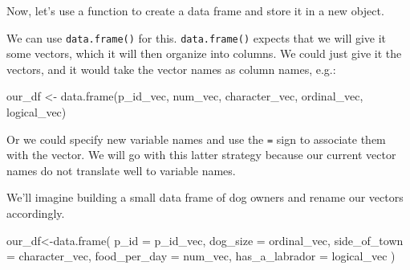 \documentclass[
  letterpaper,
  DIV=11,
  numbers=noendperiod]{scrreprt}
\newenvironment{Shaded}{\begin{snugshade}}{\end{snugshade}}
\newcommand{\AttributeTok}[1]{\textcolor[rgb]{0.40,0.45,0.13}{#1}}
\newcommand{\FunctionTok}[1]{\textcolor[rgb]{0.28,0.35,0.67}{#1}}
\newcommand{\NormalTok}[1]{\textcolor[rgb]{0.00,0.23,0.31}{#1}}
\newcommand{\OtherTok}[1]{\textcolor[rgb]{0.00,0.23,0.31}{#1}}
\begin{document}
Now, let's use a function to create a data frame and store it in a new
object.

We can use \texttt{data.frame()} for this. \texttt{data.frame()} expects
that we will give it some vectors, which it will then organize into
columns. We could just give it the vectors, and it would take the vector
names as column names, e.g.:

\begin{Shaded}
\begin{Highlighting}[]
\NormalTok{our\_df }\OtherTok{\textless{}{-}} \FunctionTok{data.frame}\NormalTok{(p\_id\_vec, num\_vec, character\_vec, ordinal\_vec, logical\_vec)}
\end{Highlighting}
\end{Shaded}

Or we could specify new variable names and use the \texttt{=} sign to
associate them with the vector. We will go with this latter strategy
because our current vector names do not translate well to variable
names.

We'll imagine building a small data frame of dog owners and rename our
vectors accordingly.

\begin{Shaded}
\begin{Highlighting}[]
\NormalTok{our\_df}\OtherTok{\textless{}{-}}\FunctionTok{data.frame}\NormalTok{(}
  \AttributeTok{p\_id =}\NormalTok{ p\_id\_vec,}
  \AttributeTok{dog\_size =}\NormalTok{ ordinal\_vec,}
  \AttributeTok{side\_of\_town =}\NormalTok{ character\_vec,}
  \AttributeTok{food\_per\_day =}\NormalTok{ num\_vec, }
  \AttributeTok{has\_a\_labrador =}\NormalTok{ logical\_vec}
\NormalTok{)}
\end{Highlighting}
\end{Shaded}
\end{document}

